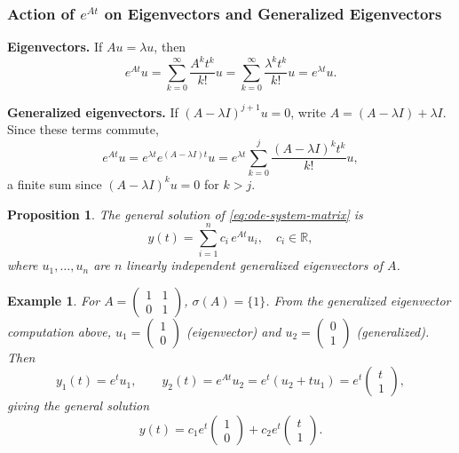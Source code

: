 \documentclass{article}
\newtheorem*{example}{Example}
\newtheorem{proposition}{Proposition}
\newcommand{\R}{\mathbb{R}}
\begin{document}
\subsubsection{Action of $e^{At}$ on Eigenvectors and Generalized 
Eigenvectors}

\textbf{Eigenvectors.} If $Au = \lambda u$, then
\[e^{At}u = \sum_{k=0}^\infty \frac{A^k t^k}{k!}u = 
\sum_{k=0}^\infty \frac{\lambda^k t^k}{k!}u = e^{\lambda t}u.\]

\textbf{Generalized eigenvectors.} If $(A-\lambda I)^{j+1}u=0$, 
write $A = (A-\lambda I) + \lambda I$. Since these terms commute,
\[e^{At}u = e^{\lambda t}e^{(A-\lambda I)t}u = 
e^{\lambda t}\sum_{k=0}^{j}\frac{(A-\lambda I)^k t^k}{k!}u,\]
a finite sum since $(A-\lambda I)^k u = 0$ for $k > j$.

\begin{proposition}
    The general solution of \eqref{eq:ode-system-matrix} is
    \[y(t) = \sum_{i=1}^n c_i\, e^{At}u_i, \quad c_i \in \R,\]
    where $u_1,\ldots,u_n$ are $n$ linearly independent generalized 
    eigenvectors of $A$.
\end{proposition}

\begin{example}
    For $A = \begin{pmatrix}1&1\\0&1\end{pmatrix}$, $\sigma(A) = 
    \{1\}$. From the generalized eigenvector computation above, 
    $u_1 = \begin{pmatrix}1\\0\end{pmatrix}$ (eigenvector) and 
    $u_2 = \begin{pmatrix}0\\1\end{pmatrix}$ (generalized). Then
    \[y_1(t) = e^t u_1, \qquad y_2(t) = e^{At}u_2 = 
    e^t(u_2 + tu_1) = e^t\begin{pmatrix}t\\1\end{pmatrix},\]
    giving the general solution
    \[y(t) = c_1 e^t\begin{pmatrix}1\\0\end{pmatrix} + 
    c_2 e^t\begin{pmatrix}t\\1\end{pmatrix}.\]
\end{example}
\end{document}
